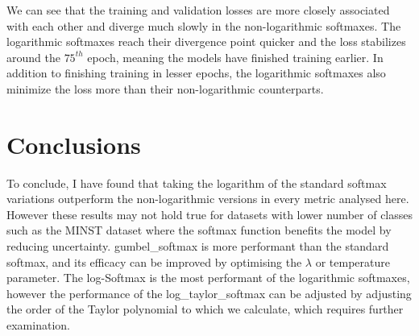 \documentclass{article}
\begin{document}
\noindent
We can see that the training and validation losses are more closely associated with each other and diverge much slowly in the non-logarithmic softmaxes.
The logarithmic softmaxes reach their divergence point quicker and the loss stabilizes around the $75^{th}$ epoch, meaning the models have finished training earlier.
\newline
\newline
\noindent
In addition to finishing training in lesser epochs, the logarithmic softmaxes also minimize the loss more than their non-logarithmic counterparts.
\newpage
\section{Conclusions}
To conclude, I have found that taking the logarithm of the standard softmax variations outperform the non-logarithmic versions in every metric analysed here.
However these results may not hold true for datasets with lower number of classes such as the MINST dataset where the softmax function benefits the model by reducing uncertainty.
gumbel\_softmax is more performant than the standard softmax, and its efficacy can be improved by optimising the $\lambda$ or temperature parameter.
The log-Softmax is the most performant of the logarithmic softmaxes, however the performance of the log\_taylor\_softmax can be adjusted by adjusting the order of the Taylor polynomial to which we calculate, which requires further examination.
\end{document}
